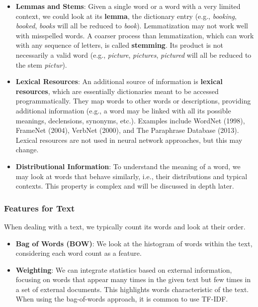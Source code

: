 \begin{itemize}
    \item \textbf{Lemmas and Stems}: Given a single word or a word with a very limited context, we could look at its \textbf{lemma}, the dictionary entry (e.g., \textit{booking}, \textit{booked}, \textit{books} will all be reduced to \textit{book}). Lemmatization may not work well with misspelled words. A coarser process than lemmatization, which can work with any sequence of letters, is called \textbf{stemming}. Its product is not necessarily a valid word (e.g., \textit{picture}, \textit{pictures}, \textit{pictured} will all be reduced to the stem \textit{pictur}).

    \item \textbf{Lexical Resources}: An additional source of information is \textbf{lexical resources}, which are essentially dictionaries meant to be accessed programmatically. They map words to other words or descriptions, providing additional information (e.g., a word may be linked with all its possible meanings, declensions, synonyms, etc.). Examples include WordNet (1998), FrameNet (2004), VerbNet (2000), and The Paraphrase Database (2013). Lexical resources are not used in neural network approaches, but this may change.

    \item \textbf{Distributional Information}: To understand the meaning of a word, we may look at words that behave similarly, i.e., their distributions and typical contexts. This property is complex and will be discussed in depth later.
\end{itemize}

\subsubsection{Features for Text}
When dealing with a text, we typically count its words and look at their order.

\begin{itemize}
    \item \textbf{Bag of Words (BOW)}: We look at the histogram of words within the text, considering each word count as a feature.
    \item \textbf{Weighting}: We can integrate statistics based on external information, focusing on words that appear many times in the given text but few times in a set of external documents. This highlights words characteristic of the text. When using the bag-of-words approach, it is common to use TF-IDF.
\end{itemize}

